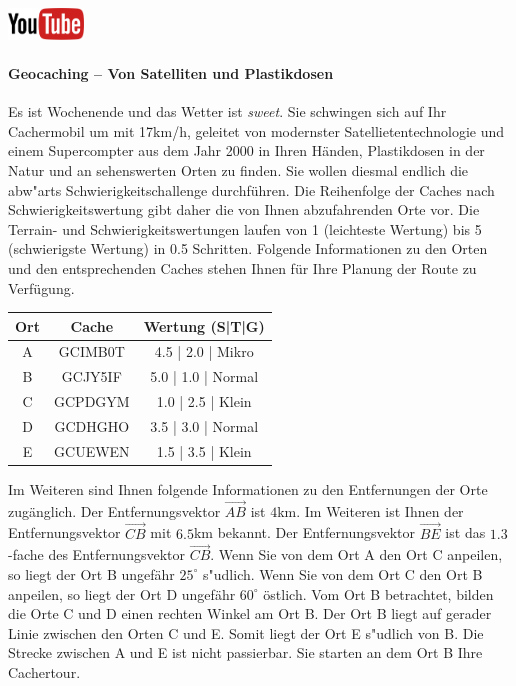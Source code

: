 \documentclass[a4paper, 9pt]{scrartcl}\usepackage[]{graphicx}\usepackage[]{xcolor}
\begin{document}
\hfill\href{https://youtu.be/3LAq3R0rS14}{\includegraphics[width =
  2cm]{img/youtube}} %
\hspace{2Ex}

\paragraph{Geocaching -- Von Satelliten und Plastikdosen}



Es ist Wochenende und das Wetter ist \textit{sweet}. Sie schwingen sich auf
Ihr Cachermobil um mit 17km/h, geleitet von modernster
Satellietentechnologie und einem Supercompter aus dem Jahr 2000 in Ihren
H{\"a}nden, Plastikdosen in der Natur und an sehenswerten Orten zu finden. Sie
wollen diesmal endlich die abw{"a}rts Schwierigkeitschallenge
durchf{\"u}hren. Die Reihenfolge der Caches nach Schwierigkeitswertung gibt daher
die von Ihnen abzufahrenden Orte vor. Die Terrain- und
Schwierigkeitswertungen laufen von 1 (leichteste Wertung) bis 5
(schwierigste Wertung) in 0.5 Schritten. Folgende Informationen zu den
Orten und den entsprechenden Caches stehen Ihnen f{\"u}r Ihre Planung der Route
zu Verf{\"u}gung.

\begin{center}
  \begin{tabular}{ ccc }
    \toprule
    Ort & Cache & Wertung (S|T|G) \\
    \midrule
    A & GCIMB0T & 4.5 | 2.0 | Mikro \\
    B & GCJY5IF & 5.0 | 1.0 | Normal \\ 
    C & GCPDGYM & 1.0 | 2.5 | Klein \\ 
    D & GCDHGHO & 3.5 | 3.0 | Normal \\ 
    E & GCUEWEN & 1.5 | 3.5 | Klein \\     
 \bottomrule
\end{tabular}
\end{center}

Im Weiteren sind Ihnen folgende Informationen zu den Entfernungen der Orte
zug{\"a}nglich. Der Entfernungsvektor $\overrightarrow{AB}$ ist
$4$km. Im Weiteren ist Ihnen der Entfernungsvektor
$\overrightarrow{CB}$ mit $6.5$km bekannt. Der
Entfernungsvektor $\overrightarrow{BE}$ ist das $1.3$-fache
des Entfernungsvektor $\overrightarrow{CB}$. Wenn Sie von dem Ort A den Ort
C anpeilen, so liegt der Ort B ungef{\"a}hr $25^\circ$
s{"u}dlich. Wenn Sie von dem Ort C den Ort B anpeilen, so liegt
der Ort D ungef{\"a}hr $60^\circ$ {\"o}stlich. Vom Ort B
betrachtet, bilden die Orte C und D einen rechten Winkel am Ort B. Der Ort
B liegt auf gerader Linie zwischen den Orten C und E. Somit liegt der Ort E
s{"u}dlich von B. Die Strecke zwischen A und E ist nicht
passierbar. Sie starten an dem Ort B Ihre Cachertour. \\
\end{document}

